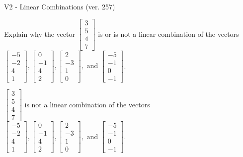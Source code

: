\begin{exercise}
  \begin{exerciseTitle}V2 - Linear Combinations (ver. 257)\end{exerciseTitle}
  \begin{exerciseStatement}
    Explain why the vector \(\left[\begin{array}{c}
3 \\
5 \\
4 \\
7
\end{array}\right]\)  is or is not a linear 
	combination of the vectors \(\left[\begin{array}{c}
-5 \\
-2 \\
4 \\
1
\end{array}\right] , \left[\begin{array}{c}
0 \\
-1 \\
4 \\
2
\end{array}\right] , \left[\begin{array}{c}
2 \\
-3 \\
1 \\
0
\end{array}\right] , \text{ and } \left[\begin{array}{c}
-5 \\
-1 \\
0 \\
-1
\end{array}\right]\).
	


  \end{exerciseStatement}
  \begin{exerciseAnswer}
   \(\left[\begin{array}{c}
3 \\
5 \\
4 \\
7
\end{array}\right]\) 
  	 is not  
	a linear combination of the vectors \(\left[\begin{array}{c}
-5 \\
-2 \\
4 \\
1
\end{array}\right] , \left[\begin{array}{c}
0 \\
-1 \\
4 \\
2
\end{array}\right] , \left[\begin{array}{c}
2 \\
-3 \\
1 \\
0
\end{array}\right] , \text{ and } \left[\begin{array}{c}
-5 \\
-1 \\
0 \\
-1
\end{array}\right]\).


\end{exerciseAnswer}
\end{exercise}
